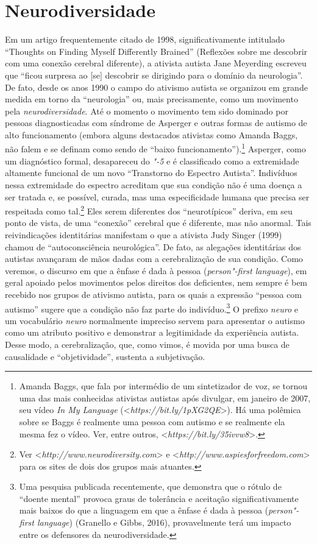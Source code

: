 \section{Neurodiversidade}

Em um artigo frequentemente citado de 1998, significativamente
intitulado ``Thoughts on Finding Myself Differently Brained'' (Reflexões
sobre me descobrir com uma conexão cerebral diferente), a ativista
autista Jane Meyerding escreveu que ``ficou surpresa ao {[}se{]}
descobrir se dirigindo para o domínio da neurologia''. De fato, desde os
anos 1990 o campo do ativismo autista se organizou em grande medida em
torno da ``neurologia'' ou, mais precisamente, como um movimento pela
\emph{neurodiversidade}. Até o momento o movimento tem sido dominado por
pessoas diagnosticadas com síndrome de Asperger e outras formas de
autismo de alto funcionamento (embora alguns destacados ativistas como
Amanda Baggs, não falem e se definam como sendo de ``baixo
funcionamento'').\footnote[7]{Amanda Baggs, que fala por intermédio de um sintetizador de voz, se
tornou uma das mais conhecidas ativistas autistas após divulgar, em
janeiro de 2007, seu vídeo \emph{In My Language}
(\textless{}\emph{https://bit.ly/1pXG2QE}\textgreater{}). Há uma polêmica
sobre se Baggs é realmente uma pessoa com autismo e se realmente ela
mesma fez o vídeo. Ver, entre outros,
\textless{}\emph{https://bit.ly/35ivvw8}\textgreater{}.} Asperger, como um diagnóstico
formal, desapareceu do \emph{"-5} e é classificado como a extremidade
altamente funcional de um novo ``Transtorno do Espectro Autista''.
Indivíduos nessa extremidade do espectro acreditam que sua condição não
é uma doença a ser tratada e, se possível, curada, mas uma
especificidade humana que precisa ser respeitada como
tal.\footnote[8]{Ver \textless{}\emph{http://www.neurodiversity.com}\textgreater{} e
\textless{}\emph{http://www.aspiesforfreedom.com}\textgreater{} para os sites de dois dos grupos
mais atuantes.} Eles serem diferentes dos ``neurotípicos''
deriva, em seu ponto de vista, de uma ``conexão'' cerebral que é
diferente, mas não anormal. Tais reivindicações identitárias manifestam
o que a ativista Judy Singer (1999) chamou de ``autoconsciência
neurológica''. De fato, as alegações identitárias dos autistas
avançaram de mãos dadas com a cerebralização de sua condição. Como
veremos, o discurso em que a ênfase é dada à pessoa (\emph{person"-first
language}), em geral apoiado pelos movimentos pelos direitos dos
deficientes, nem sempre é bem recebido nos grupos de ativismo autista,
para os quais a expressão ``pessoa com autismo'' sugere que a condição
não faz parte do indivíduo.\footnote[9]{Uma pesquisa publicada recentemente, que demonstra que o rótulo de
``doente mental'' provoca graus de tolerância e aceitação
significativamente mais baixos do que a linguagem em que a ênfase é dada
à pessoa (\emph{person"-first language})
(Granello e Gibbs, 2016), provavelmente terá um impacto entre os
defensores da neurodiversidade.} O prefixo \emph{neuro} e
um vocabulário \emph{neuro} normalmente impreciso servem para apresentar
o autismo como um atributo positivo e demonstrar a legitimidade da
experiência autista. Desse modo, a cerebralização, que, como vimos, é
movida por uma busca de causalidade e ``objetividade'', sustenta a
subjetivação.

